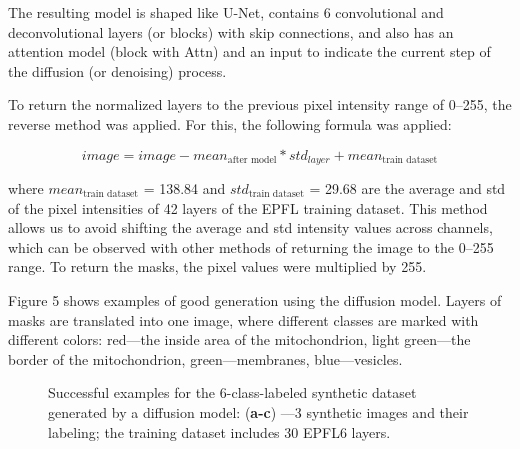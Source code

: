 \documentclass[journal,article,submit,pdftex,moreauthors]{Definitions/mdpi}
\begin{document}
The resulting model is shaped like U-Net, contains 6 convolutional and deconvolutional layers (or blocks) with skip connections, and also has an attention model (block with Attn) and an input to indicate the current step of the diffusion (or denoising) process.

To return the normalized layers to the previous pixel intensity range of 0–255, the reverse method was applied. For this, the following formula was applied:

\begin{equation}
	image = {image - mean_{\text{after model}}}\ast{std_{layer}}{+}{mean_{\text{train dataset}}}
\end{equation}

where $mean_{\text{train dataset}}$ = 138.84 and $std_{\text{train dataset}}$ = 29.68 are the average and std of the pixel intensities of 42 layers of the EPFL training dataset. This method allows us to avoid shifting the average and std intensity values across channels, which can be observed with other methods of returning the image to the 0–255 range. To return the masks, the pixel values were multiplied by 255.

Figure 5 shows examples of good generation using the diffusion model. Layers of masks are translated into one image, where different classes are marked with different colors: red—the inside area of the mitochondrion, light green—the border of the mitochondrion, green—membranes, blue—vesicles.

\begin{figure}[H]
	\hspace{0.2cm}
	\hspace{0.2cm}
	\hspace{0.2cm}
	\caption{Successful examples for the 6-class-labeled synthetic dataset generated by a diffusion model: (\textbf{a-c}) —3 synthetic images and their labeling; the training dataset includes 30 EPFL6 layers.\label{fig5}}
\end{figure}
\end{document}
